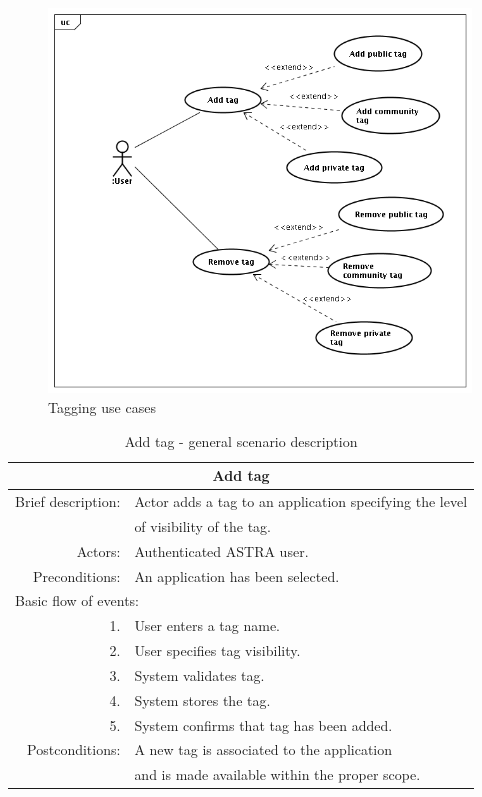 \begin{figure}[h!]
 \begin{center}
 \includegraphics[scale=0.5]{diagrams/UseCasesDiagram-tagging.png}
 \end{center}
 \caption{\label{img:uc-tagging}Tagging use cases}
\end{figure}


\begin{table}[h!]
	\small
    \begin{center}
		\begin{tabular}{||r|l||}
		\hline \hline
		\multicolumn{2}{||c||}{\bfseries{Add tag}} \\
		\hline
		\hline 
		Brief description: & Actor adds a tag to an application specifying the level\\
		& of visibility of the tag. \\
		\hline
		Actors: & Authenticated ASTRA user. \\
		\hline
		Preconditions: & An application has been selected. \\
		\hline \hline
		\multicolumn{2}{||l||}{Basic flow of events:} \\
		\hline \hline
			1. & User enters a tag name. \\
			2. & User specifies tag visibility. \\
			3. & System validates tag. \\
			4. & System stores the tag. \\ 
			5. & System confirms that tag has been added. \\
		\hline \hline
		Postconditions: & A new tag is associated to the application \\
		&  and is made available within the proper scope. \\
		\hline \hline
		\end{tabular}
		\caption{\label{table:add-tag} Add tag - general scenario description}
	\end{center}
\end{table}

